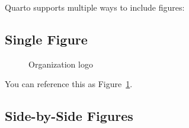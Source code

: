 \documentclass[
  letterpaper,
  oneside,
  openany]{MastersDoctoralThesis}
\theoremstyle{plain}
\theoremstyle{remark}
\begin{document}

Quarto supports multiple ways to include figures:

\subsection*{Single Figure}\label{single-figure}

\begin{figure}


\caption{\label{fig-logo}Organization logo}

\end{figure}%

You can reference this as Figure~\ref{fig-logo}.

\subsection*{Side-by-Side Figures}\label{side-by-side-figures}
\end{document}
